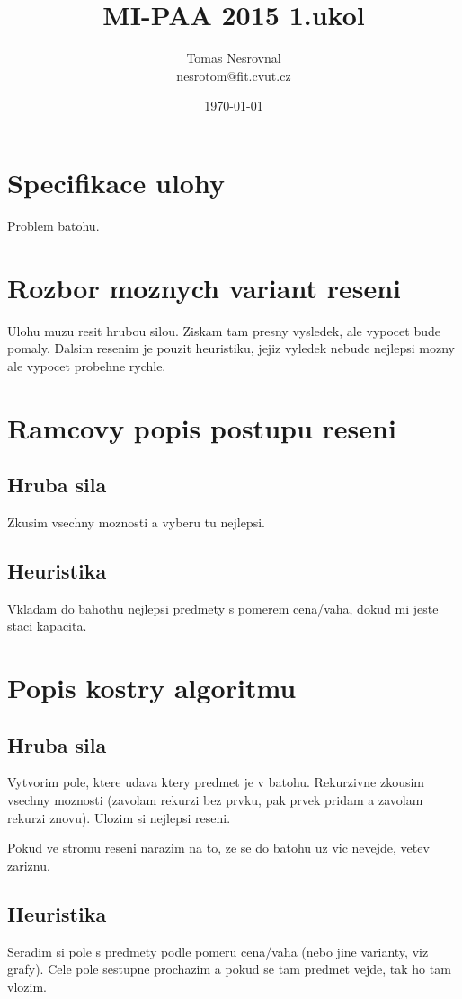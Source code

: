 \documentclass[12pt,a4paper]{article}
\begin{document}
\title{MI-PAA 2015 1.ukol}
\author{Tomas Nesrovnal\\nesrotom@fit.cvut.cz}
\date{\today}
\maketitle

\section{Specifikace ulohy}
Problem batohu.

\section{Rozbor moznych variant reseni}
Ulohu muzu resit hrubou silou. Ziskam tam presny vysledek, ale vypocet bude
pomaly. Dalsim resenim je pouzit heuristiku, jejiz vyledek nebude nejlepsi mozny
ale vypocet probehne rychle.

\section{Ramcovy popis postupu reseni}
\subsection{Hruba sila}
Zkusim vsechny moznosti a vyberu tu nejlepsi.
\subsection{Heuristika}
Vkladam do bahothu nejlepsi predmety s pomerem cena/vaha, dokud
mi jeste staci kapacita.

\section{Popis kostry algoritmu}
\subsection{Hruba sila}
Vytvorim pole, ktere udava ktery predmet je v batohu. Rekurzivne zkousim
vsechny moznosti (zavolam rekurzi bez prvku, pak prvek pridam a zavolam rekurzi znovu).
Ulozim si nejlepsi reseni.

Pokud ve stromu reseni narazim na to, ze se do batohu uz vic nevejde, vetev zariznu.
\subsection{Heuristika}
Seradim si pole s predmety podle pomeru cena/vaha (nebo jine varianty, viz grafy). Cele pole sestupne prochazim a pokud se tam predmet vejde, tak ho tam vlozim.
\end{document}
